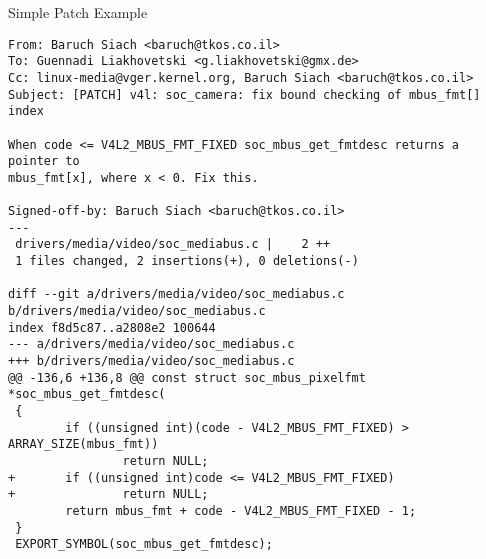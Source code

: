 \documentclass{beamer}
\begin{document}
\begin{frame}[fragile]{Simple Patch Example}
  \begin{Verbatim}[fontsize=\tiny]
From: Baruch Siach <baruch@tkos.co.il>
To: Guennadi Liakhovetski <g.liakhovetski@gmx.de>
Cc: linux-media@vger.kernel.org, Baruch Siach <baruch@tkos.co.il>
Subject: [PATCH] v4l: soc_camera: fix bound checking of mbus_fmt[] index

When code <= V4L2_MBUS_FMT_FIXED soc_mbus_get_fmtdesc returns a pointer to
mbus_fmt[x], where x < 0. Fix this.

Signed-off-by: Baruch Siach <baruch@tkos.co.il>
---
 drivers/media/video/soc_mediabus.c |    2 ++
 1 files changed, 2 insertions(+), 0 deletions(-)

diff --git a/drivers/media/video/soc_mediabus.c b/drivers/media/video/soc_mediabus.c
index f8d5c87..a2808e2 100644
--- a/drivers/media/video/soc_mediabus.c
+++ b/drivers/media/video/soc_mediabus.c
@@ -136,6 +136,8 @@ const struct soc_mbus_pixelfmt *soc_mbus_get_fmtdesc(
 {
        if ((unsigned int)(code - V4L2_MBUS_FMT_FIXED) > ARRAY_SIZE(mbus_fmt))
                return NULL;
+       if ((unsigned int)code <= V4L2_MBUS_FMT_FIXED)
+               return NULL;
        return mbus_fmt + code - V4L2_MBUS_FMT_FIXED - 1;
 }
 EXPORT_SYMBOL(soc_mbus_get_fmtdesc);
  \end{Verbatim}
\end{frame}
\end{document}
